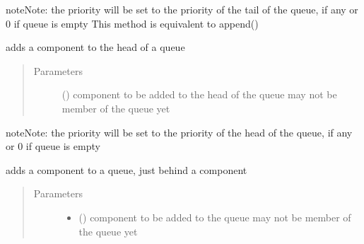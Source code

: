 \documentclass[letterpaper,10pt,english]{sphinxmanual}
\begin{document}
\begin{fulllineitems}
\begin{fulllineitems}
\begin{quote}
\begin{description}
\end{description}\end{quote}

\begin{sphinxadmonition}{note}{Note:}
the priority will be set to
the priority of the tail of the queue, if any
or 0 if queue is empty 
This method is equivalent to append()
\end{sphinxadmonition}

\end{fulllineitems}


\begin{fulllineitems}
\label{\detokenize{Reference:salabim.Queue.add_at_head}}
adds a component to the head of a queue
\begin{quote}\begin{description}
\item[{Parameters}] \leavevmode
{} ({\hyperref[\detokenize{Reference:salabim.Component}]{}}) \textendash{} component to be added to the head of the queue 
may not be member of the queue yet

\end{description}\end{quote}

\begin{sphinxadmonition}{note}{Note:}
the priority will be set to
the priority of the head of the queue, if any
or 0 if queue is empty
\end{sphinxadmonition}

\end{fulllineitems}


\begin{fulllineitems}
\label{\detokenize{Reference:salabim.Queue.add_behind}}
adds a component to a queue, just behind a component
\begin{quote}\begin{description}
\item[{Parameters}] \leavevmode\begin{itemize}
\item {} 
 ({\hyperref[\detokenize{Reference:salabim.Component}]{}}) \textendash{} component to be added to the queue 
may not be member of the queue yet


\end{itemize}
\end{description}
\end{quote}
\end{fulllineitems}
\end{fulllineitems}
\end{document}
